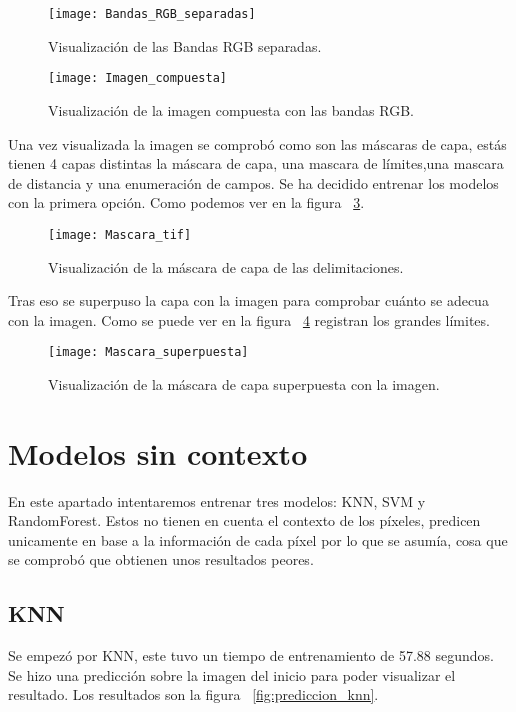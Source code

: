 \begin{figure}[H]
	\centering
	\texttt{[image: Bandas\_RGB\_separadas]}
	\caption[Visualización de las Bandas RGB separadas]{Visualización de las Bandas RGB separadas.}
	\label{fig:bandas_rgb}
\end{figure}
\begin{figure}[H]
	\centering
	\texttt{[image: Imagen\_compuesta]}
	\caption[Visualización de la imagen compuesta con las bandas RGB]{Visualización de la imagen compuesta con las bandas RGB.}
	\label{fig:imagen_compuesta}
\end{figure}

Una vez visualizada la imagen se comprobó como son las máscaras de capa, estás tienen 4 capas distintas la máscara de capa, una mascara de límites,una mascara de distancia y una enumeración de campos. Se ha decidido entrenar los modelos con la primera opción. Como podemos ver en la figura ~\ref{fig:mascara_sola}.

\begin{figure}[H]
	\centering
	\texttt{[image: Mascara\_tif]}
	\caption[Visualización de la máscara de capa de las delimitaciones]{Visualización de la máscara de capa de las delimitaciones.}
	\label{fig:mascara_sola}
\end{figure}

Tras eso se superpuso la capa con la imagen para comprobar cuánto se adecua con la imagen. Como se puede ver en la figura  ~\ref{fig:mascara_superpuesta} registran los grandes límites.

\begin{figure}[H]
	\centering
	\texttt{[image: Mascara\_superpuesta]}
	\caption[Visualización de la máscara de capa superpuesta con la imagen]{Visualización de la máscara de capa superpuesta con la imagen.}
	\label{fig:mascara_superpuesta}
\end{figure}

 
\section{Modelos sin contexto}
En este apartado intentaremos entrenar tres modelos: KNN, SVM y RandomForest. Estos no tienen en cuenta el contexto de los píxeles, predicen unicamente en base a la información de cada píxel por lo que se asumía, cosa que se comprobó que obtienen unos resultados peores. 

\subsection{KNN}
Se empezó por KNN, este tuvo un tiempo de entrenamiento de 57.88 segundos. Se hizo una predicción sobre la imagen del inicio para poder visualizar el resultado. Los resultados son la figura ~\ref{fig:prediccion_knn}.

